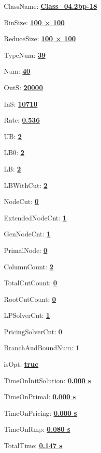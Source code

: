 \documentclass[11pt]{article}
\begin{document}
\pagestyle{empty}


ClassName: \underline{\textbf{Class_04.2bp-18}}
\par
BinSize: \underline{\textbf{100 × 100}}
\par
ReduceSize: \underline{\textbf{100 × 100}}
\par
TypeNum: \underline{\textbf{39}}
\par
Num: \underline{\textbf{40}}
\par
OutS: \underline{\textbf{20000}}
\par
InS: \underline{\textbf{10710}}
\par
Rate: \underline{\textbf{0.536}}
\par
UB: \underline{\textbf{2}}
\par
LB0: \underline{\textbf{2}}
\par
LB: \underline{\textbf{2}}
\par
LBWithCut: \underline{\textbf{2}}
\par
NodeCut: \underline{\textbf{0}}
\par
ExtendedNodeCnt: \underline{\textbf{1}}
\par
GenNodeCnt: \underline{\textbf{1}}
\par
PrimalNode: \underline{\textbf{0}}
\par
ColumnCount: \underline{\textbf{2}}
\par
TotalCutCount: \underline{\textbf{0}}
\par
RootCutCount: \underline{\textbf{0}}
\par
LPSolverCnt: \underline{\textbf{1}}
\par
PricingSolverCnt: \underline{\textbf{0}}
\par
BranchAndBoundNum: \underline{\textbf{1}}
\par
isOpt: \underline{\textbf{true}}
\par
TimeOnInitSolution: \underline{\textbf{0.000 s}}
\par
TimeOnPrimal: \underline{\textbf{0.000 s}}
\par
TimeOnPricing: \underline{\textbf{0.000 s}}
\par
TimeOnRmp: \underline{\textbf{0.080 s}}
\par
TotalTime: \underline{\textbf{0.147 s}}
\par
\newpage
\end{document}
